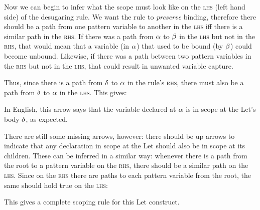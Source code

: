 Now we can begin to infer what the scope must look like on the
\textsc{lhs} (left hand side) of the desugaring rule. We want the rule to
\emph{preserve} binding, therefore there should be a path from one
pattern variable to another in the \textsc{lhs} iff there is a similar path in the
\textsc{rhs}. If there was a path from $\alpha$ to $\beta$ in the
\textsc{lhs} but not in the \textsc{rhs}, that would mean that a
variable (in $\alpha$) that used to be bound (by $\beta$) could
become unbound. Likewise, if there was a path between two pattern variables in the
\textsc{rhs} but not in the \textsc{lhs}, that could result in
unwanted variable capture.

Thus, since there is a path from $\delta$ to $\alpha$ in the rule's
\textsc{rhs}, there must also be a path from $\delta$ to $\alpha$ in the
\textsc{lhs}. This gives:
\begin{center}
\end{center}
In English, this arrow says that the variable declared at $\alpha$ is
in scope at the Let's body $\delta$, as expected.

There are still some missing arrows, however: there should be up
arrows to indicate that any declaration in scope at the Let should
also be in scope at its children. These can be inferred in a similar
way: whenever there is a path from the root to a pattern variable on the
\textsc{rhs}, there should be a similar path on the \textsc{lhs}.
Since on the \textsc{rhs} there are paths to each pattern variable from the root,
the same should hold true on the \textsc{lhs}:
\begin{center}
\end{center}
This gives a complete scoping rule for this Let construct.


